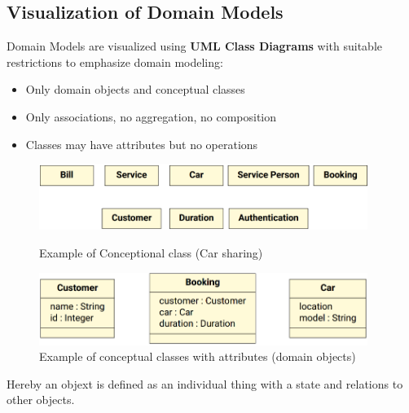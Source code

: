 \documentclass[
../../Software_Engineering_Summary.tex,
]
{subfiles}
\begin{document}
\subsection{Visualization of Domain Models}
Domain Models are visualized using \textbf{UML Class Diagrams} with suitable restrictions to emphasize domain modeling:
\begin{itemize}
    \item Only domain objects and conceptual classes
    \item Only associations, no aggregation, no composition
    \item Classes may have attributes but no operations
\end{itemize}

\begin{figure}
    [htp]
    \begin{minipage}
        [t]{0.5\textwidth}
        \centering
        \includegraphics[width=0.95\textwidth]{Pics/FirstClassModel.png}
        \caption{Example of Conceptional class (Car sharing)}
    \end{minipage}
    \hfill
    \begin{minipage}
        [t]{0.5\textwidth}
        \centering
        \includegraphics[width=0.95\textwidth]{Pics/ConceptualClass.png}
        \caption{Example of conceptual classes with attributes (domain objects)}
    \end{minipage}
\end{figure}

Hereby an objext is defined as an individual thing with a state and relations to other objects.
\end{document}
